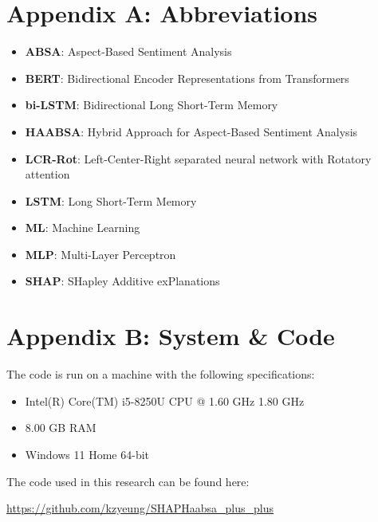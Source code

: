 \chapter*{Appendix A: Abbreviations}
    \label{app: abbreviations}
\begin{itemize}
    \item \textbf{ABSA}: Aspect-Based Sentiment Analysis
    \item \textbf{BERT}: Bidirectional Encoder Representations from Transformers
    \item \textbf{bi-LSTM}: Bidirectional Long Short-Term Memory
    \item \textbf{HAABSA}: Hybrid Approach for Aspect-Based Sentiment Analysis
    \item \textbf{LCR-Rot}: Left-Center-Right separated neural network with Rotatory attention
    \item \textbf{LSTM}: Long Short-Term Memory
    \item \textbf{ML}: Machine Learning
    \item \textbf{MLP}: Multi-Layer Perceptron
    \item \textbf{SHAP}: SHapley Additive exPlanations
\end{itemize}


\chapter{Appendix B: System \& Code}
    \label{app: code}

The code is run on a machine with the following specifications:
\begin{itemize}
    \item Intel(R) Core(TM) i5-8250U CPU @ 1.60 GHz 1.80 GHz
    \item 8.00 GB RAM
    \item Windows 11 Home 64-bit
\end{itemize}

\noindent The code used in this research can be found here:

\url{https://github.com/kzyeung/SHAPHaabsa_plus_plus}

